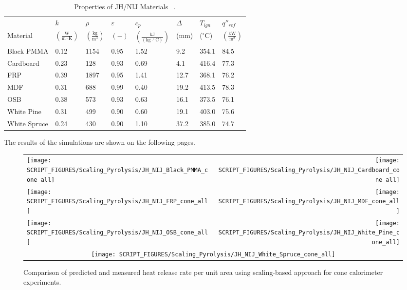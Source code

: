 \begin{table}[!h]
\caption[Properties of JH/NIJ Materials]{Properties of JH/NIJ Materials ~\cite{Lattimer:NIJ19}.}
\centering
\begin{tabular}{|p{5.5cm}|p{1.0cm}|p{1.0cm}|p{0.8cm}|p{1.4cm}|p{1.0cm}|p{1.0cm}|p{1.2cm}|}
\hline
                                               & $k$    & $\rho$      & $\varepsilon$   & $c_{p}$ & $\Delta$    & $T_{ign}$ & $q''_{ref}$ \\
Material                                       & $\mathrm{\left(\frac{W}{m\cdot K}\right)}$ & $\mathrm{\left(\frac{kg}{m^{3}}\right)}$ & $\mathrm{( - )}$ & $\mathrm{\left(\frac{kJ}{(kg\cdot ^{\circ}C)}\right)}$ &  ($\mathrm{mm}$)   & ($\mathrm{^{\circ}C}$) & $\mathrm{\left(\frac{kW}{m^{2}}\right)}$ \\ \hline
\hline
Black PMMA & 0.12 & 1154 & 0.95 & 1.52 & 9.2 & 354.1 & 84.5 \\ \hline 
Cardboard & 0.23 & 128 & 0.93 & 0.69 & 4.1 & 416.4 & 77.3 \\ \hline 
FRP & 0.39 & 1897 & 0.95 & 1.41 & 12.7 & 368.1 & 76.2 \\ \hline 
MDF & 0.31 & 688 & 0.99 & 0.40 & 19.2 & 413.5 & 78.3 \\ \hline 
OSB & 0.38 & 573 & 0.93 & 0.63 & 16.1 & 373.5 & 76.1 \\ \hline 
White Pine & 0.31 & 499 & 0.90 & 0.60 & 19.1 & 403.0 & 75.6 \\ \hline 
White Spruce & 0.24 & 430 & 0.90 & 1.10 & 37.2 & 385.0 & 74.7 \\ \hline 
\end{tabular}
\label{Properties_JH_NIJ_Materials}
\end{table}

The results of the simulations are shown on the following pages.

\begin{figure}[p]
\begin{tabular*}{\textwidth}{l@{\extracolsep{\fill}}r}
\texttt{[image: SCRIPT\_FIGURES/Scaling\_Pyrolysis/JH\_NIJ\_Black\_PMMA\_cone\_all]} &
\texttt{[image: SCRIPT\_FIGURES/Scaling\_Pyrolysis/JH\_NIJ\_Cardboard\_cone\_all]} \\
\texttt{[image: SCRIPT\_FIGURES/Scaling\_Pyrolysis/JH\_NIJ\_FRP\_cone\_all]} &
\texttt{[image: SCRIPT\_FIGURES/Scaling\_Pyrolysis/JH\_NIJ\_MDF\_cone\_all]} \\
\texttt{[image: SCRIPT\_FIGURES/Scaling\_Pyrolysis/JH\_NIJ\_OSB\_cone\_all]} &
\texttt{[image: SCRIPT\_FIGURES/Scaling\_Pyrolysis/JH\_NIJ\_White\_Pine\_cone\_all]} \\
 \multicolumn{2}{c}{\texttt{[image: SCRIPT\_FIGURES/Scaling\_Pyrolysis/JH\_NIJ\_White\_Spruce\_cone\_all]}}
\end{tabular*}
\caption[Heat release rate per unit area of JH/NIJ materials using scaling model]
{Comparison of predicted and measured heat release rate per unit area using scaling-based approach for cone calorimeter experiments.}
\label{JH_NIJ_HRR_materials}
\end{figure}


